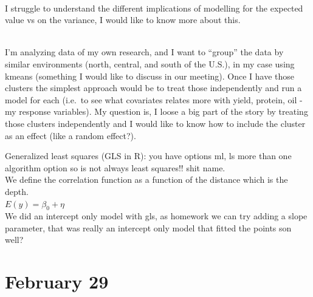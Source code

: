\documentclass[
]{book}
\begin{document}
\strut \\
I struggle to understand the different implications of modelling for the expected value vs on the variance, I would like to know more about this.\\
\strut \\
I'm analyzing data of my own research, and I want to ``group'' the data by similar environments (north, central, and south of the U.S.), in my case using kmeans (something I would like to discuss in our meeting). Once I have those clusters the simplest approach would be to treat those independently and run a model for each (i.e.~to see what covariates relates more with yield, protein, oil - my response variables). My question is, I loose a big part of the story by treating those clusters independently and I would like to know how to include the cluster as an effect (like a random effect?).

Generalized least squares (GLS in R): you have options ml, ls more than one algorithm option so is not always least squares!! shit name.\\
We define the correlation function as a function of the distance which is the depth.\\
\(E(y)=\beta_0+\eta\)\\
We did an intercept only model with gls, as homework we can try adding a slope parameter, that was really an intercept only model that fitted the points son well?

\hypertarget{february-29}{%
\section{February 29}\label{february-29}}
\end{document}
